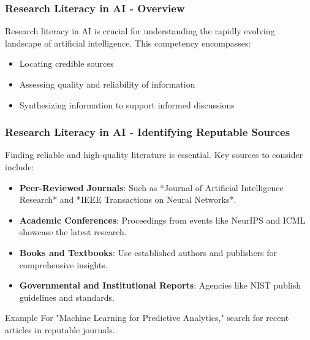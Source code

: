 \documentclass{beamer}
\begin{document}
\begin{frame}[fragile]
    \frametitle{Research Literacy in AI - Overview}
    Research literacy in AI is crucial for understanding the rapidly evolving landscape of artificial intelligence. 
    This competency encompasses:
    \begin{itemize}
        \item Locating credible sources
        \item Assessing quality and reliability of information
        \item Synthesizing information to support informed discussions
    \end{itemize}
\end{frame}

\begin{frame}[fragile]
    \frametitle{Research Literacy in AI - Identifying Reputable Sources}
    Finding reliable and high-quality literature is essential. Key sources to consider include:
    \begin{itemize}
        \item \textbf{Peer-Reviewed Journals}: Such as *Journal of Artificial Intelligence Research* and *IEEE Transactions on Neural Networks*.
        \item \textbf{Academic Conferences}: Proceedings from events like NeurIPS and ICML showcase the latest research.
        \item \textbf{Books and Textbooks}: Use established authors and publishers for comprehensive insights.
        \item \textbf{Governmental and Institutional Reports}: Agencies like NIST publish guidelines and standards.
    \end{itemize}
    \begin{block}{Example}
        For "Machine Learning for Predictive Analytics," search for recent articles in reputable journals.
    \end{block}
\end{frame}
\end{document}
